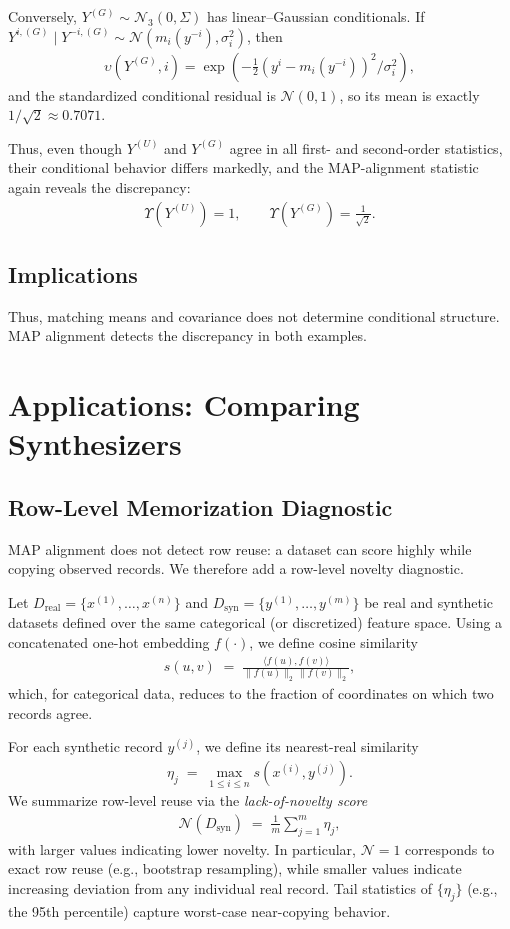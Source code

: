 \documentclass[runningheads]{llncs}
\def\EQSP{3pt}
\newcommand{\cgather}[2][\EQSP]{\begingroup\setlength\abovedisplayskip{#1}\setlength\belowdisplayskip{#1}\begin{gather} #2 \end{gather}\endgroup\noindent}
\begin{document}
Conversely, $Y^{(G)} \sim \mathcal{N}_3(0,\Sigma)$ has
linear--Gaussian conditionals. If
$Y^{i,(G)} \mid Y^{-i,(G)} \sim \mathcal{N}(m_i(y^{-i}), \sigma_i^2)$,
then
\cgather{
\upsilon(Y^{(G)}, i)
=
\exp\!\left(
-\tfrac12 (y^i - m_i(y^{-i}))^2 / \sigma_i^2
\right),
}
and the standardized conditional residual is $\mathcal{N}(0,1)$, so its mean is exactly $1/\sqrt{2}\approx0.7071$.

Thus, even though $Y^{(U)}$ and $Y^{(G)}$ agree in all first- and
second-order statistics, their conditional behavior differs markedly,
and the MAP-alignment statistic again reveals the discrepancy:
\cgather{
\Upsilon(Y^{(U)}) = 1,
\qquad
\Upsilon(Y^{(G)}) = \frac{1}{\sqrt{2}}.
}

\subsection{Implications}

Thus, matching means and covariance does not determine conditional structure.
MAP alignment detects the discrepancy in both examples.


\section{Applications: Comparing Synthesizers}\label{sec:applications}

\subsection{Row-Level Memorization Diagnostic}

MAP alignment does not detect row reuse: a dataset can score highly while
copying observed records. We therefore add a row-level novelty diagnostic.

Let $D_{\mathrm{real}}=\{x^{(1)},\ldots,x^{(n)}\}$ and
$D_{\mathrm{syn}}=\{y^{(1)},\ldots,y^{(m)}\}$ be real and synthetic datasets
defined over the same categorical (or discretized) feature space. Using a
concatenated one-hot embedding $f(\cdot)$, we define cosine similarity
\cgather{
s(u,v)
\;=\;
\frac{\langle f(u), f(v)\rangle}
{\|f(u)\|_2\,\|f(v)\|_2},
} which, for categorical data, reduces to the fraction of coordinates on which two
records agree.

For each synthetic record $y^{(j)}$, we define its nearest-real similarity
\cgather{
\eta_j
\;=\;
\max_{1 \le i \le n}
s\!\left(x^{(i)}, y^{(j)}\right).
}
We summarize row-level reuse via the \emph{lack-of-novelty score}
\cgather{
\mathcal{N}(D_{\mathrm{syn}})
\;=\;
\frac{1}{m}\sum_{j=1}^m \eta_j,
}
with larger values indicating lower novelty. In particular,
$\mathcal{N}=1$ corresponds to exact row reuse (e.g., bootstrap resampling),
while smaller values indicate increasing deviation from any individual real
record. Tail statistics of $\{\eta_j\}$ (e.g., the 95th percentile)
capture worst-case near-copying behavior.
\end{document}
